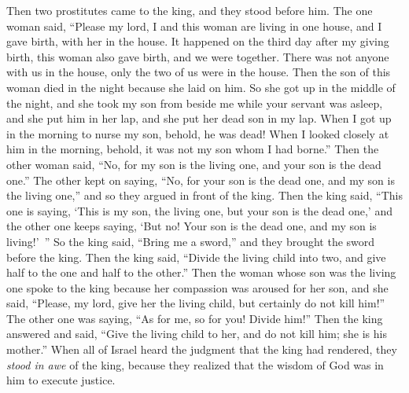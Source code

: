 \begin{biblechapter}
 Then two prostitutes came to the king, and they stood before him.
\verse The one woman said, “Please my lord, I and this woman are living in one house, and I gave birth, with her in the house.
\verse It happened on the third day after my giving birth, this woman also gave birth, and we were together. There was not anyone with us in the house, only the two of us were in the house.
\verse Then the son of this woman died in the night because she laid on him.
\verse So she got up in the middle of the night, and she took my son from beside me while your servant was asleep, and she put him in her lap, and she put her dead son in my lap.
\verse When I got up in the morning to nurse my son, behold, he was dead! When I looked closely at him in the morning, behold, it was not my son whom I had borne.”
\verse Then the other woman said, “No, for my son is the living one, and your son is the dead one.” The other kept on saying, “No, for your son is the dead one, and my son is the living one,” and so they argued in front of the king.
\verse Then the king said, “This one is saying, ‘This is my son, the living one, but your son is the dead one,’ and the other one keeps saying, ‘But no! Your son is the dead one, and my son is living!’ ”
\verse So the king said, “Bring me a sword,” and they brought the sword before the king.
\verse Then the king said, “Divide the living child into two, and give half to the one and half to the other.”
\verse Then the woman whose son was the living one spoke to the king because her compassion was aroused for her son, and she said, “Please, my lord, give her the living child, but certainly do not kill him!” The other one was saying, “As for me, so for you! Divide him!”
\verse Then the king answered and said, “Give the living child to her, and do not kill him; she is his mother.”
\verse When all of Israel heard the judgment that the king had rendered, they \textit{stood in awe} of the king, because they realized that the wisdom of God was in him to execute justice.
\end{biblechapter}

